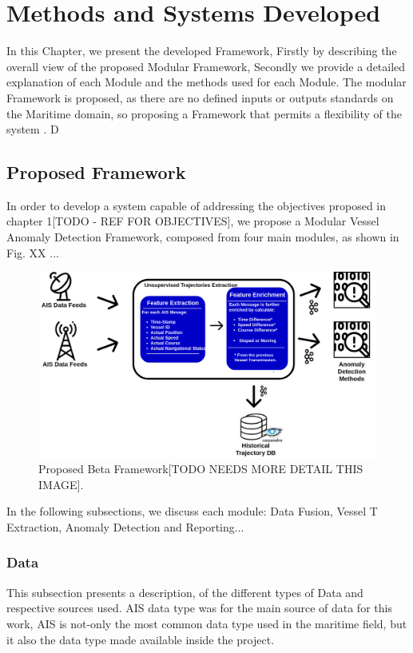 \chapter{Methods and Systems Developed}
\label{chapter:Chapter 3}

In this Chapter, we present the developed Framework, Firstly by describing the overall view of the proposed Modular Framework, Secondly we provide a detailed explanation of each Module and the methods used for each Module. The modular Framework is proposed, as there are no defined inputs or outputs standards on the Maritime domain, so proposing a Framework that permits a flexibility of the system . D

\section{Proposed Framework}
In order to develop a system capable of addressing the objectives proposed in chapter 1[TODO - REF FOR OBJECTIVES], we propose a Modular Vessel Anomaly Detection Framework, composed from four main modules, as shown in Fig. XX ...

\begin{figure}[H]
	\centering
	\includegraphics[scale = .29]{figures/UTE.png}
    \caption{Proposed Beta Framework[TODO NEEDS MORE DETAIL THIS IMAGE].}
    \label{fig: Framework}
\end{figure}

In the following subsections, we discuss each module: Data Fusion, Vessel T Extraction, Anomaly Detection and Reporting...

\subsection{Data}
This subsection presents a description, of the different types of Data and respective sources used. AIS data type was for the main source of data for this work, AIS is not-only the most common data type used in the maritime field, but it also the data type made available inside the project.



